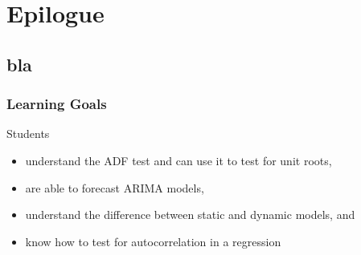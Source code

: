 \section{Epilogue}\subsection*{bla}
\begin{frame}\frametitle{Learning Goals}
Students
\begin{itemize}
\item understand the ADF test and can use it to test for unit roots,
\item are able to forecast ARIMA models,
\item understand the difference between static and dynamic models, and
\item know how to test for autocorrelation in a regression
\end{itemize}

\end{frame}



